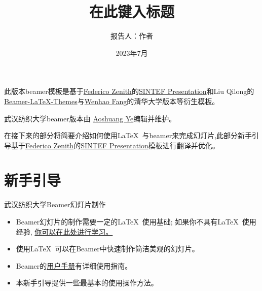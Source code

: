 \documentclass{beamer}
\title{在此键入标题}
\author{报告人：作者}
\date{2023年7月}
\newcommand{\hrefcol}[2]{\textcolor{cyan}{\href{#1}{#2}}}
\begin{document}
\maketitle

\begin{frame}

此版本beamer模板是基于\hrefcol{mailto:federico.zenith@sintef.no}{Federico Zenith}的\hrefcol{https://www.overleaf.com/latex/templates/sintef-presentation/jhbhdffczpnx}{SINTEF Presentation}和Liu Qilong的\hrefcol{https://github.com/TOB-KNPOB/Beamer-LaTeX-Themes}{Beamer-LaTeX-Themes}与\hrefcol{https://github.com/FangWHao}{Wenhao Fang}的清华大学版本等衍生模板。

\vspace{\baselineskip}

 武汉纺织大学beamer版本由 \hrefcol{mailto:asye@wtu.edu.cn}{Aoshuang Ye}编辑并维护。

\vspace{\baselineskip}

在接下来的部分将简要介绍如何使用\LaTeX\ 与beamer来完成幻灯片,此部分新手引导基于\hrefcol{mailto:federico.zenith@sintef.no}{Federico Zenith}的\hrefcol{https://www.overleaf.com/latex/templates/sintef-presentation/jhbhdffczpnx}{SINTEF Presentation}模板进行翻译并优化。


\end{frame}

\section{新手引导}

\begin{frame}{武汉纺织大学Beamer幻灯片制作}
\begin{itemize}
\item Beamer幻灯片的制作需要一定的\LaTeX\ 使用基础; 如果你不具有\LaTeX\ 使用经验,
\hrefcol{http://en.wikibooks.org/wiki/LaTeX/}{你可以在此处进行学习。}
\item 使用\LaTeX\ 可以在Beamer中快速制作简洁美观的幻灯片。
\item Beamer的\hrefcol{http://www.ctan.org/tex-archive/macros/latex/contrib/beamer/doc/beameruserguide.pdf}{用户手册}有详细使用指南。
\item 本新手引导提供一些最基本的使用操作方法。
\end{itemize}
\end{frame}
\end{document}
